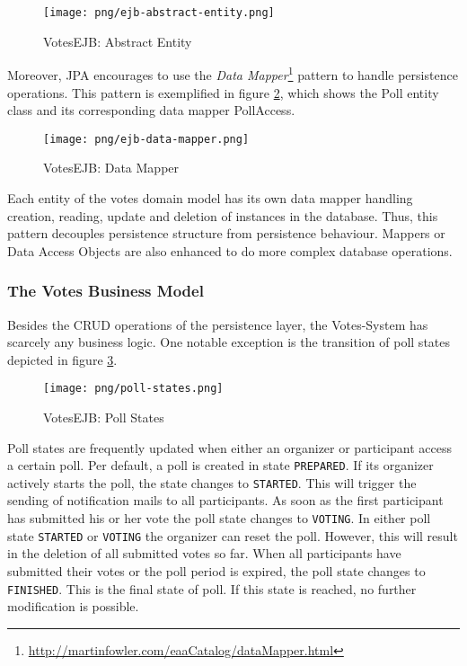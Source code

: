 \begin{figure}[h]
\centering
\texttt{[image: png/ejb-abstract-entity.png]}
\caption{VotesEJB: Abstract Entity}
\label{figure:ejb-abstract-entity}
\end{figure}

Moreover, JPA encourages to use the \textit{Data Mapper}\footnote{\url{http://martinfowler.com/eaaCatalog/dataMapper.html}} pattern to handle persistence operations.
This pattern is exemplified in figure \ref{figure:ejb-data-mapper}, which shows the Poll entity class and its corresponding data mapper PollAccess.

\begin{figure}[h]
\centering
\texttt{[image: png/ejb-data-mapper.png]}
\caption{VotesEJB: Data Mapper}
\label{figure:ejb-data-mapper}
\end{figure}

Each entity of the votes domain model has its own data mapper handling creation, reading, update and deletion of instances in the database.
Thus, this pattern decouples persistence structure from persistence behaviour. 
Mappers or Data Access Objects are also enhanced to do more complex database operations.

\subsubsection{The Votes Business Model}
\label{subsubsec:the-votes-business-model}
Besides the CRUD operations of the persistence layer, the Votes-System has scarcely any business logic.
One notable exception is the transition of poll states depicted in figure \ref{figure:poll-states}.

\begin{figure}[h]
\centering
\texttt{[image: png/poll-states.png]}
\caption{VotesEJB: Poll States}
\label{figure:poll-states}
\end{figure}

Poll states are frequently updated when either an organizer or participant access a certain poll.
Per default, a poll is created in state \texttt{PREPARED}.
If its organizer actively starts the poll, the state changes to \texttt{STARTED}.
This will trigger the sending of notification mails to all participants.
As soon as the first participant has submitted his or her vote the poll state changes to \texttt{VOTING}.
In either poll state \texttt{STARTED} or \texttt{VOTING} the organizer can reset the poll.
However, this will result in the deletion of all submitted votes so far.
When all participants have submitted their votes or the poll period is expired, the poll state changes to \texttt{FINISHED}.
This is the final state of poll.
If this state is reached, no further modification is possible.


